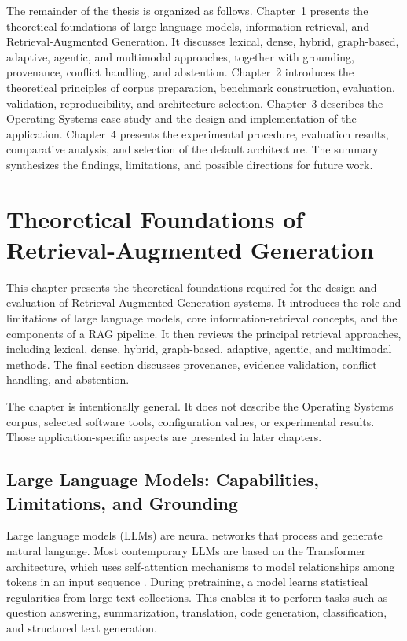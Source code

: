 \documentclass[12pt,a4paper]{report}
\numberwithin{equation}{chapter}
\begin{document}
The remainder of the thesis is organized as follows. Chapter~1 presents the theoretical foundations of large language models, information retrieval, and Retrieval-Augmented Generation. It discusses lexical, dense, hybrid, graph-based, adaptive, agentic, and multimodal approaches, together with grounding, provenance, conflict handling, and abstention. Chapter~2 introduces the theoretical principles of corpus preparation, benchmark construction, evaluation, validation, reproducibility, and architecture selection. Chapter~3 describes the Operating Systems case study and the design and implementation of the application. Chapter~4 presents the experimental procedure, evaluation results, comparative analysis, and selection of the default architecture. The summary synthesizes the findings, limitations, and possible directions for future work.

\chapter{Theoretical Foundations of Retrieval-Augmented Generation}

This chapter presents the theoretical foundations required for the design and evaluation of Retrieval-Augmented Generation systems. It introduces the role and limitations of large language models, core information-retrieval concepts, and the components of a RAG pipeline. It then reviews the principal retrieval approaches, including lexical, dense, hybrid, graph-based, adaptive, agentic, and multimodal methods. The final section discusses provenance, evidence validation, conflict handling, and abstention.

The chapter is intentionally general. It does not describe the Operating Systems corpus, selected software tools, configuration values, or experimental results. Those application-specific aspects are presented in later chapters.

\section{Large Language Models: Capabilities, Limitations, and Grounding}

Large language models (LLMs) are neural networks that process and generate natural language. Most contemporary LLMs are based on the Transformer architecture, which uses self-attention mechanisms to model relationships among tokens in an input sequence \cite{Vaswani2017}. During pretraining, a model learns statistical regularities from large text collections. This enables it to perform tasks such as question answering, summarization, translation, code generation, classification, and structured text generation.
\end{document}
